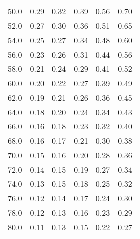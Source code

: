 \begin{tabular}{lrrrrr}
50.0 &                        0.29 &                        0.32 &                        0.39 &                        0.56 &                          0.70 \\
52.0 &                        0.27 &                        0.30 &                        0.36 &                        0.51 &                          0.65 \\
54.0 &                        0.25 &                        0.27 &                        0.34 &                        0.48 &                          0.60 \\
56.0 &                        0.23 &                        0.26 &                        0.31 &                        0.44 &                          0.56 \\
58.0 &                        0.21 &                        0.24 &                        0.29 &                        0.41 &                          0.52 \\
60.0 &                        0.20 &                        0.22 &                        0.27 &                        0.39 &                          0.49 \\
62.0 &                        0.19 &                        0.21 &                        0.26 &                        0.36 &                          0.45 \\
64.0 &                        0.18 &                        0.20 &                        0.24 &                        0.34 &                          0.43 \\
66.0 &                        0.16 &                        0.18 &                        0.23 &                        0.32 &                          0.40 \\
68.0 &                        0.16 &                        0.17 &                        0.21 &                        0.30 &                          0.38 \\
70.0 &                        0.15 &                        0.16 &                        0.20 &                        0.28 &                          0.36 \\
72.0 &                        0.14 &                        0.15 &                        0.19 &                        0.27 &                          0.34 \\
74.0 &                        0.13 &                        0.15 &                        0.18 &                        0.25 &                          0.32 \\
76.0 &                        0.12 &                        0.14 &                        0.17 &                        0.24 &                          0.30 \\
78.0 &                        0.12 &                        0.13 &                        0.16 &                        0.23 &                          0.29 \\
80.0 &                        0.11 &                        0.13 &                        0.15 &                        0.22 &                          0.27 \\
\bottomrule
\end{tabular}

